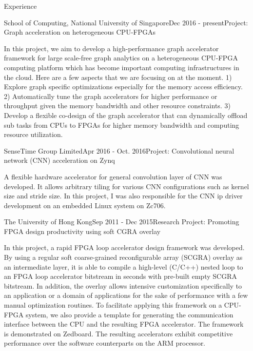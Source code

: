 \documentclass{resume} %
\begin{document}
\begin{rSection}{Experience}
\begin{rSubsection}{School of Computing, National University of Singapore}{Dec
    2016 - present}{Project: Graph acceleration on heterogeneous CPU-FPGAs}{}
\item In this project, we aim to develop a high-performance graph accelerator framework for 
    large scale-free graph analytics on a heterogeneous CPU-FPGA computing platform which has 
    become important computing infrastructures in the cloud. Here are a few aspects that we 
    are focusing on at the moment. 1) Explore graph specific optimizations especially for the 
    memory access efficiency. 2) Automatically tune the graph accelerators for higher performance 
    or throughput given the memory bandwidth and other resource constraints. 
    3) Develop a flexible co-design of the graph accelerator that can dynamically 
    offload sub tasks from CPUs to FPGAs for higher memory bandwidth and computing resource utilization.  
\end{rSubsection}

\begin{rSubsection}{SenseTime Group Limited}{Apr 2016 - Oct. 2016}{Project: Convolutional neural network
    (CNN) acceleration on Zynq}{}
\item A flexible hardware accelerator for general convolution layer of CNN was developed. It allows
arbitrary tiling for various CNN configurations such as kernel size and stride size. In this project, 
I was also responsible for the CNN ip driver development on an embedded Linux system on Zc706.
\end{rSubsection}

\begin{rSubsection}{The University of Hong Kong}{Sep 2011 - Dec 2015}{Research Project: Promoting FPGA design productivity using soft CGRA overlay}{}
\item In this project, a rapid FPGA loop accelerator design framework was developed. By using a
    regular soft coarse-grained reconfigurable array (SCGRA) overlay as an intermediate layer, it is
    able to compile a high-level (C/C++) nested loop to an FPGA loop accelerator bitstream in
    seconds with pre-built empty SCGRA bitstream. In addition, the overlay allows intensive customization 
    specifically to an application or a domain of applications for the sake of performance with 
    a few manual optimization routines. To facilitate applying this framework on a CPU-FPGA system,
    we also provide a template for generating the communication interface between the CPU and 
    the resulting FPGA accelerator. The framework is demonstrated on Zedboard. The resulting 
    accelerators exhibit competitive performance over the software counterparts on the ARM processor. 
\end{rSubsection}


\end{rSection}
\end{document}
